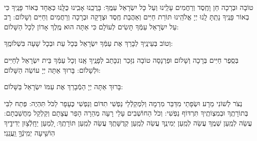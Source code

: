 \documentclass[twoside, openany, parskip=half, 11pt]{book}
\begin{document}

\clearpage

\begin{paracol}{2}
\\
 טוֹבָה וּבְרָכָה חֵן וָחֶֽסֶד וְרַחֲמִים עָלֵֽינוּ וְעַל כָּל יִשְׂרָאֵל עַמֶּֽךָ: בָּרֲכֵֽנוּ אָבִֽינוּ כֻּלָּֽנוּ כְּאֶחָד בְּאוֹר פָּנֶֽיךָ כִּי בְאוֹר פָּנֶֽיךָ נָתַֽתָּ לָֽנוּ יְיָ אֱלֹהֵֽינוּ תּוֹרַת חַיִּים וְאַהֲבַת חֶֽסֶד וּצְדָקָה וּבְרָכָה וְרַחֲמִים וְחַיִּים וְשָׁלוֹם: 
\switchcolumn
{}
 רָב עַל יִשְׂרָאֵל עַמְּֿךָ תָּשִׂים לְעוֹלָם כִּי אַתָּה הוּא מֶֽלֶךְ אָדוֹן לְכָל הַשָּׁלוֹם:
\end{paracol}
 וְטוֹב בְּעֵינֶֽיךָ לְבָרֵךְ אֶת עַמְּֿךָ יִשְׂרָאֵל בְּכָל עֵת וּבְכָל שָׁעָה בִּשְׁלוֹמֶֽךָ:


\begin{paracol}{2}
\begin{small}
 בְּסֵֽפֶר חַיִּים בְּרָכָה וְשָׁלוֹם וּפַרְנָסָה טוֹבָה נִזָּכֵר וְנִכָּתֵב לְפָנֶֽיךָ אָֽנוּ וְכָל עַמְּֿךָ בֵּית יִשְׂרָאֵל לְחַיִּים וּלְשָׁלוֹם: בָּרוּךְ אַתָּה יְיָ עוֹשֵׂה הַשָּׁלוֹם:

\end{small}
\switchcolumn
בָּרוּךְ אַתָּה יְיָ הַמְֿבָרֵךְ אֶת עַמּוֹ יִשְׂרָאֵל בַּשָּׁלוֹם:

\end{paracol}

 נְצֹר לְשׁוֹנִי מֵרָע וּשְׂפָתַי מִדַּבֵּר מִרְמָה וְלִמְקַלְֿלַי נַפְשִׁי תִדּוֹם וְנַפְשִׁי כֶּעָפָר לַכֹּל תִּהְיֶה: פְּתַח לִבִּי בְּתוֹרָתֶֽךָ וּבְמִצְוֹתֶֽיךָ תִּרְדּוֹף נַפְשִׁי: וְכֹל הַחוֹשְׁבִים עָלַי רָעָה מְהֵרָה הָפֵר עֲצָתָם וְקַלְקֵל מַחֲשַׁבְתָם: עֲשֵׂה לְמַֽעַן שְׁמֶֽךָ עֲשֵׂה לְמַֽעַן יְמִינֶֽךָ עֲשֵׂה לְמַֽעַן קְדֻשָּׁתֶֽךָ עֲשֵׂה לְמַֽעַן תּוֹרָתֶֽךָ: לְ֭מַעַן יֵחָֽלְֿצ֥וּן יְדִידֶ֑יךָ הֽוֹשִׁ֖יעָה יְמִֽינְֿךָ֣ וַֽעֲנֵֽנִי׃ 
  
\end{document}
